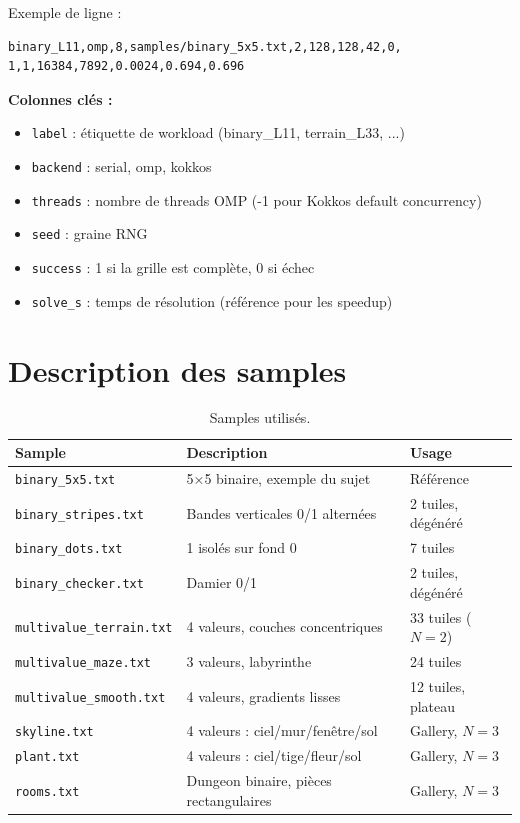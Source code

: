 Exemple de ligne :
\begin{verbatim}
binary_L11,omp,8,samples/binary_5x5.txt,2,128,128,42,0,
1,1,16384,7892,0.0024,0.694,0.696
\end{verbatim}

\textbf{Colonnes clés :}
\begin{itemize}
    \item \texttt{label} : étiquette de workload (binary\_L11, terrain\_L33, ...)
    \item \texttt{backend} : serial, omp, kokkos
    \item \texttt{threads} : nombre de threads OMP (-1 pour Kokkos default concurrency)
    \item \texttt{seed} : graine RNG
    \item \texttt{success} : 1 si la grille est complète, 0 si échec
    \item \texttt{solve\_s} : temps de résolution (référence pour les speedup)
\end{itemize}

\section{Description des samples}
\label{sec:annexes:samples}

\begin{table}[H]
\centering
\begin{tabularx}{\textwidth}{lXl}
\toprule
\textbf{Sample} & \textbf{Description} & \textbf{Usage} \\
\midrule
\texttt{binary\_5x5.txt} & 5×5 binaire, exemple du sujet & Référence \\
\texttt{binary\_stripes.txt} & Bandes verticales 0/1 alternées & 2 tuiles, dégénéré \\
\texttt{binary\_dots.txt} & 1 isolés sur fond 0 & 7 tuiles \\
\texttt{binary\_checker.txt} & Damier 0/1 & 2 tuiles, dégénéré \\
\texttt{multivalue\_terrain.txt} & 4 valeurs, couches concentriques & 33 tuiles ($N=2$) \\
\texttt{multivalue\_maze.txt} & 3 valeurs, labyrinthe & 24 tuiles \\
\texttt{multivalue\_smooth.txt} & 4 valeurs, gradients lisses & 12 tuiles, plateau \\
\texttt{skyline.txt} & 4 valeurs : ciel/mur/fenêtre/sol & Gallery, $N=3$ \\
\texttt{plant.txt} & 4 valeurs : ciel/tige/fleur/sol & Gallery, $N=3$ \\
\texttt{rooms.txt} & Dungeon binaire, pièces rectangulaires & Gallery, $N=3$ \\
\bottomrule
\end{tabularx}
\caption{Samples utilisés.}
\label{tab:annexes:samples}
\end{table}


